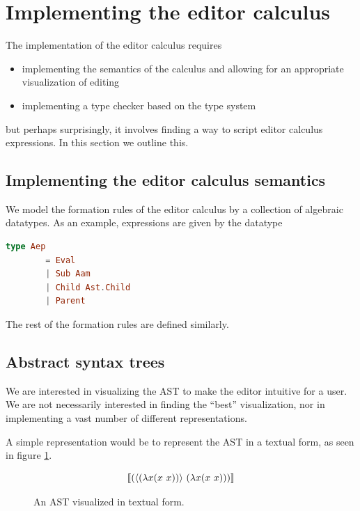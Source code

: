 \section{Implementing the editor calculus}

The implementation of the editor calculus requires

\begin{itemize}
\item implementing the semantics of the calculus and allowing for an
  appropriate visualization of editing
\item implementing a type checker based on the type system
\end{itemize}

but perhaps surprisingly, it involves finding a way to script editor
calculus expressions. In this section we outline this.

\subsection{Implementing the editor calculus semantics}

We model the formation rules of the editor calculus by a collection of
algebraic datatypes. As an example, expressions are given by the
datatype

\begin{lstlisting}[language=elm,%
                   label={aep-without-holes-definition},%
                   gobble=4,%
                   caption={Formation rules (\ref{aep-formation-rules}) modeled in Elm},%
                   ]
    type Aep
        = Eval
        | Sub Aam
        | Child Ast.Child
        | Parent
\end{lstlisting}

The rest of the formation rules are defined similarly.

\subsection{Abstract syntax trees}

We are interested in visualizing the AST to make the editor intuitive
for a user.  We are not necessarily interested in finding the ``best''
visualization, nor in implementing a vast number of different
representations.

A simple representation would be to represent the AST in a textual form,
as seen in figure \ref{fig:ast-in-text-form}.

\begin{figure}[H]
    \Large
    \begin{equation*}
      \llbracket (\langle (\lambda{x}{(x~x)}) \rangle~(\lambda{x}{(x~x)})) \rrbracket
    \end{equation*}
    \caption{An AST visualized in textual form.}
    \label{fig:ast-in-text-form}
\end{figure}

